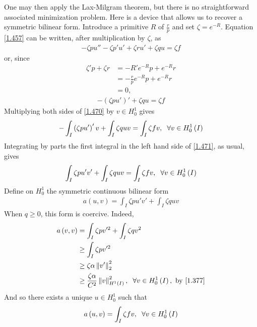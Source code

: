 \documentclass[a4paper,oneside]{article}
\numberwithin{equation}{section}
\begin{document}
One may then apply the Lax-Milgram theorem, but there is no straightforward associated minimization problem. Here is a device that allows us to recover a symmetric bilinear form. Introduce a primitive $R$ of $\frac{r}{p}$ and set $\zeta  = {e^{ - R}}$. Equation \eqref{1.457} can be written, after multiplication by $\zeta$, as
\begin{align}
 - \zeta pu'' - \zeta p'u' + \zeta ru' + \zeta qu = \zeta f
\end{align}
or, since
\begin{align}
\zeta 'p + \zeta r &=  - R'{e^{ - R}}p + {e^{ - R}}r\\
 &=  - \frac{r}{p}{e^{ - R}}p + {e^{ - R}}r\\
& = 0,
\end{align}
\begin{align}
\label{1.470}
- \left( {\zeta pu'} \right)' + \zeta qu = \zeta f
\end{align}
Multiplying both sides of \eqref{1.470} by $v\in H_0^1$ gives
\begin{align}
\label{1.471}
 - \int_I {\left( {\zeta pu'} \right)'v}  + \int_I {\zeta quv}  = \int_I {\zeta fv} ,\hspace{0.2cm}\forall v \in H_0^1\left( I \right)
\end{align}
Integrating by parts the first integral in the left hand side of \eqref{1.471}, as usual, gives
\begin{align}
\int_I {\zeta pu'v'}  + \int_I {\zeta quv}  = \int_I {\zeta fv} ,\hspace{0.2cm}\forall v \in H_0^1\left( I \right)
\end{align}
Define on $H_0^1$ the symmetric continuous bilinear form
\begin{align}
a\left( {u,v} \right) = \int_I {\zeta pu'v'}  + \int_I {\zeta quv} 
\end{align}
When $q\ge 0$, this form is coercive. Indeed,
\begin{align}
a\left( {v,v} \right) &= \int_I {\zeta pv{'^2}}  + \int_I {\zeta q{v^2}} \\
& \ge \int_I {\zeta pv{'^2}} \\
& \ge \zeta \alpha \left\| {v'} \right\|_2^2\\
& \ge \frac{{\zeta \alpha }}{{{C^2}}}\left\| v \right\|_{{H^1}\left( I \right)}^2,\hspace{0.2cm}\forall v \in H_0^1\left( I \right),\mbox{ by \eqref{1.377}}
\end{align}
And so there exists a unique $u\in H_0^1$ such that
\begin{align}
a\left( {u,v} \right) = \int_I {\zeta fv} ,\hspace{0.2cm}\forall v \in H_0^1\left( I \right)
\end{align}
\end{document}
